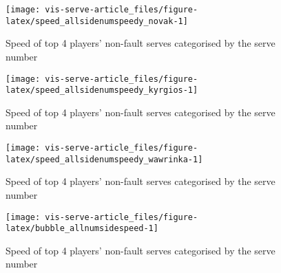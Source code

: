 \documentclass[article]{jss}
\begin{document}
\begin{CodeChunk}
\begin{figure}

{\centering \texttt{[image: vis-serve-article\_files/figure-latex/speed\_allsidenumspeedy\_novak-1]} 

}

\caption[Speed of top 4 players' non-fault serves categorised by the serve number]{Speed of top 4 players' non-fault serves categorised by the serve number}\label{fig:speed_allsidenumspeedy_novak}
\end{figure}
\end{CodeChunk}

\begin{CodeChunk}
\begin{figure}

{\centering \texttt{[image: vis-serve-article\_files/figure-latex/speed\_allsidenumspeedy\_kyrgios-1]} 

}

\caption[Speed of top 4 players' non-fault serves categorised by the serve number]{Speed of top 4 players' non-fault serves categorised by the serve number}\label{fig:speed_allsidenumspeedy_kyrgios}
\end{figure}
\end{CodeChunk}

\begin{CodeChunk}
\begin{figure}

{\centering \texttt{[image: vis-serve-article\_files/figure-latex/speed\_allsidenumspeedy\_wawrinka-1]} 

}

\caption[Speed of top 4 players' non-fault serves categorised by the serve number]{Speed of top 4 players' non-fault serves categorised by the serve number}\label{fig:speed_allsidenumspeedy_wawrinka}
\end{figure}
\end{CodeChunk}

\begin{CodeChunk}
\begin{figure}

{\centering \texttt{[image: vis-serve-article\_files/figure-latex/bubble\_allnumsidespeed-1]} 

}

\caption[Speed of top 4 players' non-fault serves categorised by the serve number]{Speed of top 4 players' non-fault serves categorised by the serve number}\label{fig:bubble_allnumsidespeed}
\end{figure}
\end{CodeChunk}
\end{document}
